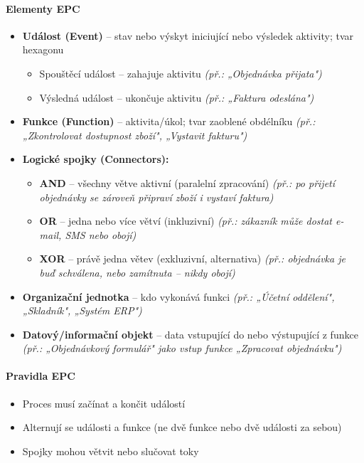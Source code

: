 \paragraph{Elementy EPC}
\begin{itemize}
  \item \textbf{Událost (Event)} -- stav nebo výskyt iniciující nebo výsledek aktivity; tvar hexagonu
    \begin{itemize}
      \item Spouštěcí událost -- zahajuje aktivitu \textit{(př.: „Objednávka přijata")}
      \item Výsledná událost -- ukončuje aktivitu \textit{(př.: „Faktura odeslána")}
    \end{itemize}
  \item \textbf{Funkce (Function)} -- aktivita/úkol; tvar zaoblené obdélníku \textit{(př.: „Zkontrolovat dostupnost zboží", „Vystavit fakturu")}
  \item \textbf{Logické spojky (Connectors):}
    \begin{itemize}
      \item \textbf{AND} -- všechny větve aktivní (paralelní zpracování) \textit{(př.: po přijetí objednávky se zároveň připraví zboží i vystaví faktura)}
      \item \textbf{OR} -- jedna nebo více větví (inkluzivní) \textit{(př.: zákazník může dostat e-mail, SMS nebo obojí)}
      \item \textbf{XOR} -- právě jedna větev (exkluzivní, alternativa) \textit{(př.: objednávka je buď schválena, nebo zamítnuta -- nikdy obojí)}
    \end{itemize}
  \item \textbf{Organizační jednotka} -- kdo vykonává funkci \textit{(př.: „Účetní oddělení", „Skladník", „Systém ERP")}
  \item \textbf{Datový/informační objekt} -- data vstupující do nebo výstupující z funkce \textit{(př.: „Objednávkový formulář" jako vstup funkce „Zpracovat objednávku")}
\end{itemize}

\paragraph{Pravidla EPC}
\begin{itemize}
  \item Proces musí začínat a končit událostí
  \item Alternují se události a funkce (ne dvě funkce nebo dvě události za sebou)
  \item Spojky mohou větvit nebo slučovat toky
\end{itemize}

